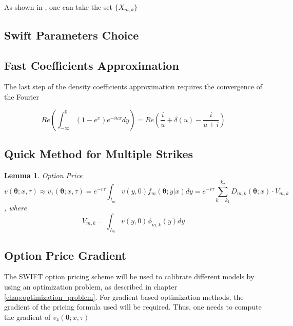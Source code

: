 \documentclass[12,twoside]{mammeTFM}
\newtheorem{lem}[thm]{Lemma}
\theoremstyle{definition}
\theoremstyle{remark}
\begin{document}
As shown in \cite{ort16}, one can take the set $\{X_{m,k}\}$

\subsection{Swift Parameters Choice}


\subsection{Fast Coefficients Approximation} \label{subsec:payoff_coefficients}

The last step of the density coefficients approximation requires the convergence of the Fourier 

\begin{equation}
Re \left( \int_{-\infty}^{0} (1 - e^x) e^{- i u x} dy \right) = Re \left(\dfrac{i}{u} + \delta(u) - \dfrac{i}{u + i} \right)
\end{equation}


\subsection{Quick Method for Multiple Strikes}

\begin{lem} Option Price
\begin{equation}
v(\boldsymbol{\theta}; x, \tau) \approx v_1(\boldsymbol{\theta}; x, \tau) = e^{-r \tau} \int_{I_m} v(y, 0) f_m(\boldsymbol{\theta}; y|x) dy = e^{-r \tau} \sum_{k = k_1}^{k_2} D_{m,k}(\boldsymbol{\theta}; x) \cdot V_{m, k}
\end{equation}
, where $$V_{m, k} = \int_{I_m} v(y, 0) \phi_{m,k}(y)dy$$
\end{lem}

\subsection{Option Price Gradient}

The SWIFT option pricing scheme will be used to calibrate different models by using an optimization problem, as described in chapter \ref{chap:optimization_problem}. For gradient-based optimization methods, the gradient of the pricing formula used will be required. Thus, one needs to compute the gradient of $v_4(\boldsymbol{\theta}; x, \tau)$
\end{document}
